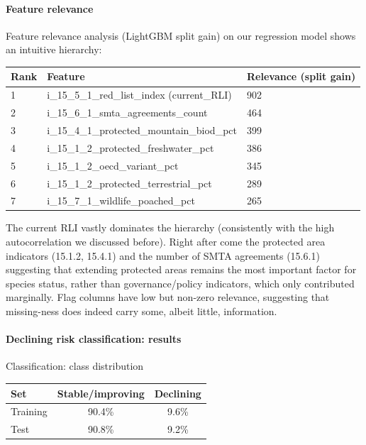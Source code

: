 \paragraph{Feature relevance} Feature relevance analysis (LightGBM split gain) on our regression model shows an intuitive hierarchy:
\begin{table}[h]
    \centering
    \begin{tabular}{lll}
        \toprule
        Rank & Feature & Relevance (split gain) \\
        \midrule
        1 & i\_15\_5\_1\_red\_list\_index (current\_RLI) & 902 \\
        2 & i\_15\_6\_1\_smta\_agreements\_count & 464 \\
        3 & i\_15\_4\_1\_protected\_mountain\_biod\_pct & 399 \\
        4 & i\_15\_1\_2\_protected\_freshwater\_pct & 386 \\
        5 & i\_15\_1\_2\_oecd\_variant\_pct & 345 \\
        6 & i\_15\_1\_2\_protected\_terrestrial\_pct & 289 \\
        7 & i\_15\_7\_1\_wildlife\_poached\_pct & 265 \\
        \bottomrule
    \end{tabular}
\end{table}

The current RLI vastly dominates the hierarchy (consistently with the high autocorrelation we discussed before). Right after come the protected area indicators (15.1.2, 15.4.1) and the number of SMTA agreements (15.6.1) suggesting that extending protected areas remains the most important factor for species status, rather than governance/policy indicators, which only contributed marginally. Flag columns have low but non-zero relevance, suggesting that missing-ness does indeed carry some, albeit little, information.

\paragraph{Declining risk classification: results}

\begin{center}
Classification: class distribution
\vspace{4pt}

\begin{tabular}{lcc}
\toprule
Set & Stable/improving & Declining \\
\midrule
Training & 90.4\% & 9.6\% \\
Test     & 90.8\% & 9.2\% \\
\bottomrule
\end{tabular}
\end{center}

